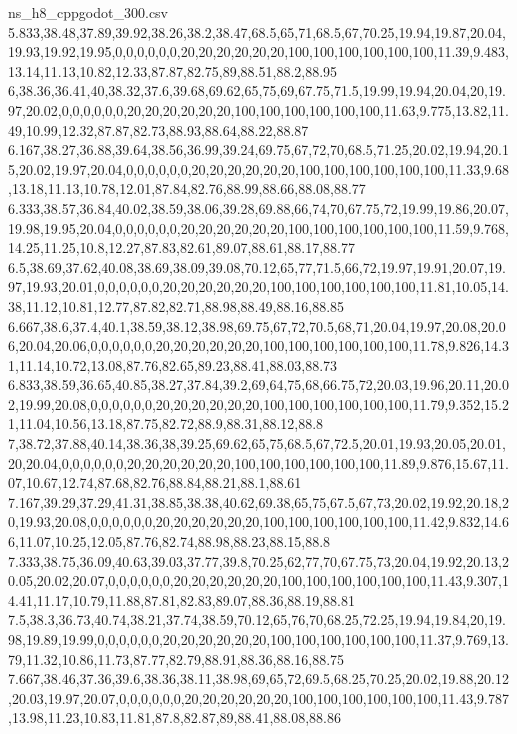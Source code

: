 \begin{filecontents*}[overwrite]{ns_h8_cppgodot_300.csv}
5.833,38.48,37.89,39.92,38.26,38.2,38.47,68.5,65,71,68.5,67,70.25,19.94,19.87,20.04,19.93,19.92,19.95,0,0,0,0,0,0,20,20,20,20,20,20,100,100,100,100,100,100,11.39,9.483,13.14,11.13,10.82,12.33,87.87,82.75,89,88.51,88.2,88.95
6,38.36,36.41,40,38.32,37.6,39.68,69.62,65,75,69,67.75,71.5,19.99,19.94,20.04,20,19.97,20.02,0,0,0,0,0,0,20,20,20,20,20,20,100,100,100,100,100,100,11.63,9.775,13.82,11.49,10.99,12.32,87.87,82.73,88.93,88.64,88.22,88.87
6.167,38.27,36.88,39.64,38.56,36.99,39.24,69.75,67,72,70,68.5,71.25,20.02,19.94,20.15,20.02,19.97,20.04,0,0,0,0,0,0,20,20,20,20,20,20,100,100,100,100,100,100,11.33,9.68,13.18,11.13,10.78,12.01,87.84,82.76,88.99,88.66,88.08,88.77
6.333,38.57,36.84,40.02,38.59,38.06,39.28,69.88,66,74,70,67.75,72,19.99,19.86,20.07,19.98,19.95,20.04,0,0,0,0,0,0,20,20,20,20,20,20,100,100,100,100,100,100,11.59,9.768,14.25,11.25,10.8,12.27,87.83,82.61,89.07,88.61,88.17,88.77
6.5,38.69,37.62,40.08,38.69,38.09,39.08,70.12,65,77,71.5,66,72,19.97,19.91,20.07,19.97,19.93,20.01,0,0,0,0,0,0,20,20,20,20,20,20,100,100,100,100,100,100,11.81,10.05,14.38,11.12,10.81,12.77,87.82,82.71,88.98,88.49,88.16,88.85
6.667,38.6,37.4,40.1,38.59,38.12,38.98,69.75,67,72,70.5,68,71,20.04,19.97,20.08,20.06,20.04,20.06,0,0,0,0,0,0,20,20,20,20,20,20,100,100,100,100,100,100,11.78,9.826,14.31,11.14,10.72,13.08,87.76,82.65,89.23,88.41,88.03,88.73
6.833,38.59,36.65,40.85,38.27,37.84,39.2,69,64,75,68,66.75,72,20.03,19.96,20.11,20.02,19.99,20.08,0,0,0,0,0,0,20,20,20,20,20,20,100,100,100,100,100,100,11.79,9.352,15.21,11.04,10.56,13.18,87.75,82.72,88.9,88.31,88.12,88.8
7,38.72,37.88,40.14,38.36,38,39.25,69.62,65,75,68.5,67,72.5,20.01,19.93,20.05,20.01,20,20.04,0,0,0,0,0,0,20,20,20,20,20,20,100,100,100,100,100,100,11.89,9.876,15.67,11.07,10.67,12.74,87.68,82.76,88.84,88.21,88.1,88.61
7.167,39.29,37.29,41.31,38.85,38.38,40.62,69.38,65,75,67.5,67,73,20.02,19.92,20.18,20,19.93,20.08,0,0,0,0,0,0,20,20,20,20,20,20,100,100,100,100,100,100,11.42,9.832,14.66,11.07,10.25,12.05,87.76,82.74,88.98,88.23,88.15,88.8
7.333,38.75,36.09,40.63,39.03,37.77,39.8,70.25,62,77,70,67.75,73,20.04,19.92,20.13,20.05,20.02,20.07,0,0,0,0,0,0,20,20,20,20,20,20,100,100,100,100,100,100,11.43,9.307,14.41,11.17,10.79,11.88,87.81,82.83,89.07,88.36,88.19,88.81
7.5,38.3,36.73,40.74,38.21,37.74,38.59,70.12,65,76,70,68.25,72.25,19.94,19.84,20,19.98,19.89,19.99,0,0,0,0,0,0,20,20,20,20,20,20,100,100,100,100,100,100,11.37,9.769,13.79,11.32,10.86,11.73,87.77,82.79,88.91,88.36,88.16,88.75
7.667,38.46,37.36,39.6,38.36,38.11,38.98,69,65,72,69.5,68.25,70.25,20.02,19.88,20.12,20.03,19.97,20.07,0,0,0,0,0,0,20,20,20,20,20,20,100,100,100,100,100,100,11.43,9.787,13.98,11.23,10.83,11.81,87.8,82.87,89,88.41,88.08,88.86

\end{filecontents*}
